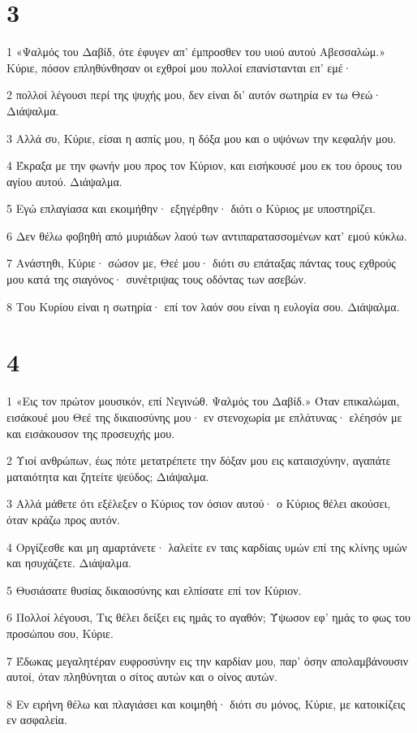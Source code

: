 \chapter{3}

\par 1 «Ψαλμός του Δαβίδ, ότε έφυγεν απ' έμπροσθεν του υιού αυτού Αβεσσαλώμ.» Κύριε, πόσον επληθύνθησαν οι εχθροί μου πολλοί επανίστανται επ' εμέ·
\par 2 πολλοί λέγουσι περί της ψυχής μου, δεν είναι δι' αυτόν σωτηρία εν τω Θεώ· Διάψαλμα.
\par 3 Αλλά συ, Κύριε, είσαι η ασπίς μου, η δόξα μου και ο υψόνων την κεφαλήν μου.
\par 4 Έκραξα με την φωνήν μου προς τον Κύριον, και εισήκουσέ μου εκ του όρους του αγίου αυτού. Διάψαλμα.
\par 5 Εγώ επλαγίασα και εκοιμήθην· εξηγέρθην· διότι ο Κύριος με υποστηρίζει.
\par 6 Δεν θέλω φοβηθή από μυριάδων λαού των αντιπαρατασσομένων κατ' εμού κύκλω.
\par 7 Ανάστηθι, Κύριε· σώσον με, Θεέ μου· διότι συ επάταξας πάντας τους εχθρούς μου κατά της σιαγόνος· συνέτριψας τους οδόντας των ασεβών.
\par 8 Του Κυρίου είναι η σωτηρία· επί τον λαόν σου είναι η ευλογία σου. Διάψαλμα.

\chapter{4}

\par 1 «Εις τον πρώτον μουσικόν, επί Νεγινώθ. Ψαλμός του Δαβίδ.» Όταν επικαλώμαι, εισάκουέ μου Θεέ της δικαιοσύνης μου· εν στενοχωρία με επλάτυνας· ελέησόν με και εισάκουσον της προσευχής μου.
\par 2 Υιοί ανθρώπων, έως πότε μετατρέπετε την δόξαν μου εις καταισχύνην, αγαπάτε ματαιότητα και ζητείτε ψεύδος; Διάψαλμα.
\par 3 Αλλά μάθετε ότι εξέλεξεν ο Κύριος τον όσιον αυτού· ο Κύριος θέλει ακούσει, όταν κράζω προς αυτόν.
\par 4 Οργίζεσθε και μη αμαρτάνετε· λαλείτε εν ταις καρδίαις υμών επί της κλίνης υμών και ησυχάζετε. Διάψαλμα.
\par 5 Θυσιάσατε θυσίας δικαιοσύνης και ελπίσατε επί τον Κύριον.
\par 6 Πολλοί λέγουσι, Τις θέλει δείξει εις ημάς το αγαθόν; Ύψωσον εφ' ημάς το φως του προσώπου σου, Κύριε.
\par 7 Έδωκας μεγαλητέραν ευφροσύνην εις την καρδίαν μου, παρ' όσην απολαμβάνουσιν αυτοί, όταν πληθύνηται ο σίτος αυτών και ο οίνος αυτών.
\par 8 Εν ειρήνη θέλω και πλαγιάσει και κοιμηθή· διότι συ μόνος, Κύριε, με κατοικίζεις εν ασφαλεία.


